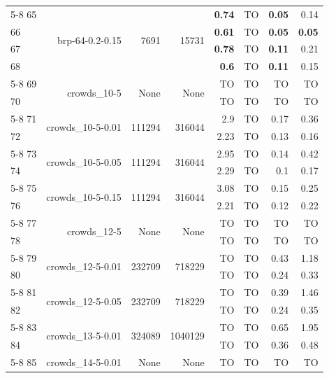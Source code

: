 \begin{longtable}{lrr@{\hskip 12pt}r@{\hskip 12pt}r@{\hskip 12pt}r@{\hskip 12pt}r@{\hskip 12pt}r}
\cmidrule{5-8}
65 & \multirow{4}{*}{brp-64-0.2-0.15} & \multirow{4}{*}{7691} & \multirow{4}{*}{15731} & \textbf{0.74} & TO & \textbf{0.05} & 0.14 \\
66 &  &  &  & \textbf{0.61} & TO & \textbf{0.05} & \textbf{0.05} \\
67 &  &  &  & \textbf{0.78} & TO & \textbf{0.11} & 0.21 \\
68 &  &  &  & \textbf{0.6} & TO & \textbf{0.11} & 0.15 \\
\cmidrule{5-8}
69 & \multirow{2}{*}{crowds\_10-5} & \multirow{2}{*}{None} & \multirow{2}{*}{None} & TO & TO & TO & TO \\
70 &  &  &  & TO & TO & TO & TO \\
\cmidrule{5-8}
71 & \multirow{2}{*}{crowds\_10-5-0.01} & \multirow{2}{*}{111294} & \multirow{2}{*}{316044} & 2.9 & TO & 0.17 & 0.36 \\
72 &  &  &  & 2.23 & TO & 0.13 & 0.16 \\
\cmidrule{5-8}
73 & \multirow{2}{*}{crowds\_10-5-0.05} & \multirow{2}{*}{111294} & \multirow{2}{*}{316044} & 2.95 & TO & 0.14 & 0.42 \\
74 &  &  &  & 2.29 & TO & 0.1 & 0.17 \\
\cmidrule{5-8}
75 & \multirow{2}{*}{crowds\_10-5-0.15} & \multirow{2}{*}{111294} & \multirow{2}{*}{316044} & 3.08 & TO & 0.15 & 0.25 \\
76 &  &  &  & 2.21 & TO & 0.12 & 0.22 \\
\cmidrule{5-8}
77 & \multirow{2}{*}{crowds\_12-5} & \multirow{2}{*}{None} & \multirow{2}{*}{None} & TO & TO & TO & TO \\
78 &  &  &  & TO & TO & TO & TO \\
\cmidrule{5-8}
79 & \multirow{2}{*}{crowds\_12-5-0.01} & \multirow{2}{*}{232709} & \multirow{2}{*}{718229} & TO & TO & 0.43 & 1.18 \\
80 &  &  &  & TO & TO & 0.24 & 0.33 \\
\cmidrule{5-8}
81 & \multirow{2}{*}{crowds\_12-5-0.05} & \multirow{2}{*}{232709} & \multirow{2}{*}{718229} & TO & TO & 0.39 & 1.46 \\
82 &  &  &  & TO & TO & 0.24 & 0.35 \\
\cmidrule{5-8}
83 & \multirow{2}{*}{crowds\_13-5-0.01} & \multirow{2}{*}{324089} & \multirow{2}{*}{1040129} & TO & TO & 0.65 & 1.95 \\
84 &  &  &  & TO & TO & 0.36 & 0.48 \\
\cmidrule{5-8}
85 & \multirow{2}{*}{crowds\_14-5-0.01} & \multirow{2}{*}{None} & \multirow{2}{*}{None} & TO & TO & TO & TO \\

\end{longtable}
